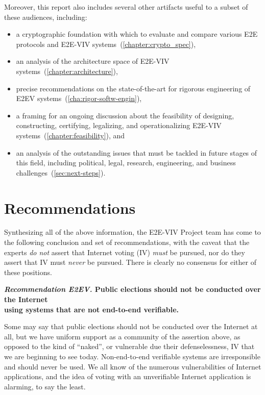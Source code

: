 Moreover, this report also includes several other artifacts useful to
a subset of these audiences, including:
\begin{itemize}
\item a cryptographic foundation with which to evaluate and compare
  various E2E protocols and E2E-VIV
  systems~(\autoref{chapter:crypto_spec}),
\item an analysis of the architecture space of E2E-VIV
  systems~(\autoref{chapter:architecture}),
\item precise recommendations on the state-of-the-art for rigorous
  engineering of E2EV systems~(\autoref{cha:rigor-softw-engin}),
\item a framing for an ongoing discussion about the feasibility of
  designing, constructing, certifying, legalizing, and operationalizing
  E2E-VIV systems~(\autoref{chapter:feasibility}), and
\item an analysis of the outstanding issues that must be tackled in
  future stages of this field, including political, legal, research,
  engineering, and business challenges~(\autoref{sec:next-steps}).
\end{itemize}

\section{Recommendations}

Synthesizing all of the above information, the E2E-VIV Project team
has come to the following conclusion and set of recommendations, with
the caveat that the experts \emph{do not} assert that Internet voting
(IV) \emph{must} be pursued, nor do they assert that IV must
\emph{never} be pursued. There is clearly no consensus for either of
these positions.

\begin{center}
  \textbf{\emph{Recommendation E2EV.} Public elections should not be
    conducted over the Internet\\
    using systems that are not end-to-end verifiable.}
\end{center}

Some may say that public elections should not be conducted over the
Internet at all, but we have uniform support as a community of the
assertion above, as opposed to the kind of ``naked'', or vulnerable
due their defenselessness, IV that we are beginning to see
today. Non-end-to-end verifiable systems are irresponsible and should
never be used. We all know of the numerous vulnerabilities of Internet
applications, and the idea of voting with an unverifiable Internet
application is alarming, to say the least.

